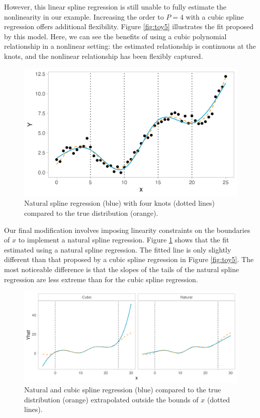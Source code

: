 \documentclass[12pt, twoside]{amherstthesis}
\begin{document}
However, this linear spline regression is still unable to fully estimate the nonlinearity in our example. Increasing the order to \(P=4\) with a cubic spline regression offers additional flexibility. Figure \ref{fig:toy5} illustrates the fit proposed by this model. Here, we can see the benefits of using a cubic polynomial relationship in a nonlinear setting: the estimated relationship is continuous at the knots, and the nonlinear relationship has been flexibly captured.
\begin{figure}

{\centering \includegraphics[width=0.75\linewidth]{figures/ch3_toy6} 

}

\caption{Natural spline regression (blue) with four knots (dotted lines) compared to the true distribution (orange).}\label{fig:toy6}
\end{figure}
Our final modification involves imposing linearity constraints on the boundaries of \(x\) to implement a natural spline regression. Figure \ref{fig:toy6} shows that the fit estimated using a natural spline regression. The fitted line is only slightly different than that proposed by a cubic spline regression in Figure \ref{fig:toy5}. The most noticeable difference is that the slopes of the tails of the natural spline regression are less extreme than for the cubic spline regression.
\begin{figure}

{\centering \includegraphics[width=1\linewidth]{figures/ch3_toybounds} 

}

\caption{Natural and cubic spline regression (blue) compared to the true distribution (orange) extrapolated outside the bounds of $x$ (dotted lines).}\label{fig:toybounds}
\end{figure}
\end{document}
